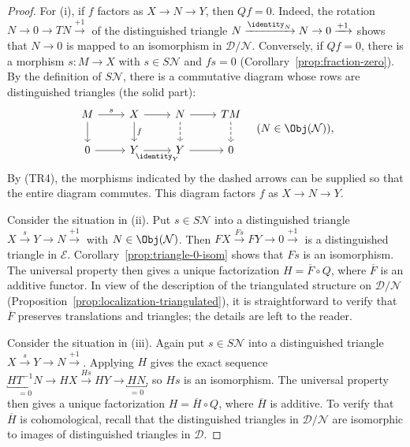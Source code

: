 \begin{proof}
	For (i), if $f$ factors as $X \to N \to Y$, then $Qf = 0$. Indeed, the
	rotation $N \to 0 \to TN \xrightarrow{+1}$ of the distinguished triangle
	$N \xrightarrow{\identity_N} N \to 0 \xrightarrow{+1}$ shows that
	$N \to 0$ is mapped to an isomorphism in
	$\mathcal{D}/\mathcal{N}$. Conversely, if $Qf = 0$, there is a morphism
	$s: M \to X$ with $s \in S\mathcal{N}$ and $fs = 0$
	(Corollary~\ref{prop:fraction-zero}). By the definition of
	$S\mathcal{N}$, there is a commutative diagram whose rows are
	distinguished triangles (the solid part):
	\[\begin{tikzcd}
		M \arrow[r, "s"] \arrow[d] & X \arrow[d, "f"] \arrow[r] & N \arrow[r] \arrow[dashed, d] & TM \arrow[dashed, d] \\
		0 \arrow[r] & Y \arrow[r, "{\identity_Y}"'] & Y \arrow[r] & 0
	\end{tikzcd} \quad (N \in \Obj(\mathcal{N})), \]
	By (TR4), the morphisms indicated by the dashed arrows can be supplied so
	that the entire diagram commutes. This diagram factors $f$ as
	$X \to N \to Y$.

	Consider the situation in (ii). Put $s \in S\mathcal{N}$ into a
	distinguished triangle $X \xrightarrow{s} Y \to N \xrightarrow{+1}$ with
	$N \in \Obj(\mathcal{N})$. Then
	$FX \xrightarrow{Fs} FY \to 0 \xrightarrow{+1}$ is a distinguished
	triangle in $\mathcal{E}$. Corollary~\ref{prop:triangle-0-isom} shows that
	$Fs$ is an isomorphism. The universal property then gives a unique
	factorization $H = \overline{F} \circ Q$, where $\overline{F}$ is an
	additive functor. In view of the description of the triangulated
	structure on $\mathcal{D}/\mathcal{N}$
	(Proposition~\ref{prop:localization-triangulated}), it is straightforward
	to verify that $\overline{F}$ preserves translations and triangles; the
	details are left to the reader.

	Consider the situation in (iii). Again put $s \in S\mathcal{N}$ into a
	distinguished triangle $X \xrightarrow{s} Y \to N \xrightarrow{+1}$.
	Applying $H$ gives the exact sequence
	$\underbracket{HT^{-1} N}_{=0} \to HX \xrightarrow{Hs} HY \to
	\underbracket{HN}_{=0}$, so $Hs$ is an isomorphism. The universal property
	then gives a unique factorization $H = \overline{H} \circ Q$, where
	$\overline{H}$ is additive. To verify that $\overline{H}$ is
	cohomological, recall that the distinguished triangles in
	$\mathcal{D}/\mathcal{N}$ are isomorphic to images of distinguished
	triangles in $\mathcal{D}$.
\end{proof}

